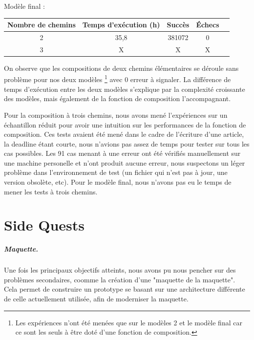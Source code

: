 \documentclass[oneside, a4paper, 11pt]{book}
\begin{document}
\begin{center}
	Modèle final :
\begin{tabular}{|c|c|c|c|c|}
	\hline
	Nombre de chemins & Temps d'exécution (h) & Succès & Échecs\\
	\hline
	2 & 35,8 & 381072 & 0 \\
	\hline
	3 & X  & X & X \\
	\hline
\end{tabular}
\end{center}

On observe que les compositions de deux chemins élémentaires se déroule sans problème pour nos deux modèles \footnote{Les expériences n'ont été menées que sur le modèles 2 et le modèle final car ce sont les seuls à être doté d'une fonction de composition.} avec 0 erreur à signaler.
La différence de temps d'exécution entre les deux modèles s'explique par la complexité croissante des modèles, mais également de la fonction de composition l'accompagnant.

Pour la composition à trois chemins, nous avons mené l'expériences sur un échantillon réduit pour avoir une intuition sur les performances de la fonction de composition. Ces tests avaient été mené dans le cadre de l'écriture d'une article, la deadline étant courte, nous n'avions pas assez de temps pour tester sur tous les cas possibles.
Les 91 cas menant à une erreur ont été vérifiés manuellement sur une machine personelle et n'ont produit aucune erreur, nous suspectons un léger problème dans l'environnement de test (un fichier qui n'est pas à jour, une version obsolète, etc).  
Pour le modèle final, nous n'avons pas eu le temps de mener les tests à trois chemins.




\chapter{Side Quests}
\label{sec:sidequests}

\paragraph{Maquette.} Une fois les principaux objectifs atteints, nous avons pu nous pencher sur des problèmes secondaires, coomme la création d'une "maquette de la maquette".
Cela permet de construire un prototype se basant sur une architecture différente de celle actuellement utilisée, afin de moderniser la maquette.
\end{document}
